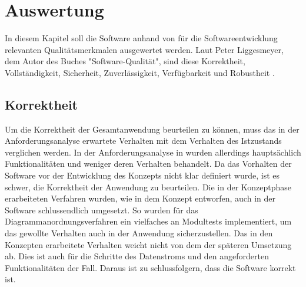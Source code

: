 \chapter{Auswertung}
\label{chap:auswertung}
In diesem Kapitel soll die Software anhand von für die Softwareentwicklung relevanten Qualitätsmerkmalen
ausgewertet werden. Laut Peter Liggesmeyer, dem Autor des Buches "Software-Qualität", sind diese
Korrektheit, Vollständigkeit, Sicherheit, Zuverlässigkeit, Verfügbarkeit und Robustheit \cite[S. 5]{SoftwareQualitaet}.

\section{Korrektheit}
\label{sec:korrektheit}
Um die Korrektheit der Gesamtanwendung beurteilen zu können, muss das in der Anforderungsanalyse erwartete
Verhalten mit dem Verhalten des Istzustands verglichen werden. In der Anforderungsanalyse
in  wurden allerdings hauptsächlich Funktionalitäten und weniger deren 
Verhalten behandelt. Da das Vorhalten der Software vor der Entwicklung des Konzepts nicht klar definiert wurde,
ist es schwer, die Korrektheit der Anwendung zu beurteilen. Die in der Konzeptphase erarbeiteten Verfahren
wurden, wie in dem Konzept entworfen, auch in der Software schlussendlich umgesetzt. So wurden für
das Diagrammanordnungsverfahren ein vielfaches an Modultests implementiert, um das gewollte Verhalten auch in
der Anwendung sicherzustellen. Das in den Konzepten erarbeitete Verhalten weicht nicht von dem der späteren
Umsetzung ab. Dies ist auch für die Schritte des Datenstroms und den angeforderten Funktionalitäten der Fall.
Daraus ist zu schlussfolgern, dass die Software korrekt ist.

